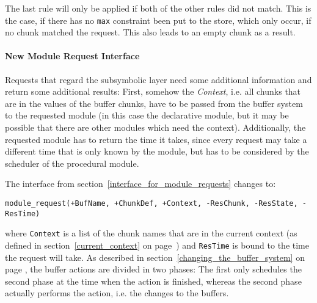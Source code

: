 The last rule will only be applied if both of the other rules did not match. This is the case, if there has no \lstinline|max| constraint been put to the store, which only occur, if no chunk matched the request. This also leads to an empty chunk as a result.

\paragraph{New Module Request Interface}

Requests that regard the subsymbolic layer need some additional information and return some additional results: First, somehow the \emph{Context}, i.e. all chunks that are in the values of the buffer chunks, have to be passed from the buffer system to the requested module (in this case the declarative module, but it may be possible that there are other modules which need the context). Additionally, the requested module has to return the time it takes, since every request may take a different time that is only known by the module, but has to be considered by the scheduler of the procedural module.

The interface from section~\ref{interface_for_module_requests} changes to:

\begin{lstlisting}[label=lst:imodule_final, caption={The final version of the interface \emph{IModule}}]
module_request(+BufName, +ChunkDef, +Context, -ResChunk, -ResState, -ResTime) 
\end{lstlisting}

where \lstinline|Context| is a list of the chunk names that are in the current context (as defined in section~\ref{current_context} on page~\pageref{current_context}) and \lstinline|ResTime| is bound to the time the request will take. As described in section~\ref{changing_the_buffer_system} on page \pageref{changing_the_buffer_system}, the buffer actions are divided in two phases: The first only schedules the second phase at the time when the action is finished, whereas the second phase actually performs the action, i.e. the changes to the buffers.

